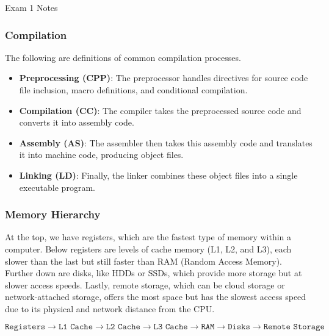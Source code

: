 \begin{examnotes}{Exam 1 Notes}
    \subsubsection*{Compilation}
    
    The following are definitions of common compilation processes.

    \begin{itemize}
        \item \textbf{Preprocessing (CPP)}: The preprocessor handles directives for source code file inclusion, macro definitions, and conditional compilation.
        \item \textbf{Compilation (CC)}: The compiler takes the preprocessed source code and converts it into assembly code.
        \item \textbf{Assembly (AS)}: The assembler then takes this assembly code and translates it into machine code, producing object files.
        \item \textbf{Linking (LD)}: Finally, the linker combines these object files into a single executable program.
    \end{itemize}

    \subsubsection*{Memory Hierarchy}

    At the top, we have registers, which are the fastest type of memory within a computer. Below registers are levels of cache memory (L1, L2, and L3), each slower than the last but still faster than 
    RAM (Random Access Memory). Further down are disks, like HDDs or SSDs, which provide more storage but at slower access speeds. Lastly, remote storage, which can be cloud storage or network-attached 
    storage, offers the most space but has the slowest access speed due to its physical and network distance from the CPU.

    \begin{highlight}
        \begin{equation*}
            \texttt{Registers} \rightarrow \texttt{L1 Cache} \rightarrow \texttt{L2 Cache} \rightarrow \texttt{L3 Cache} \rightarrow \texttt{RAM} \rightarrow \texttt{Disks} \rightarrow \texttt{Remote Storage}
        \end{equation*}
    \end{highlight}


\end{examnotes}
